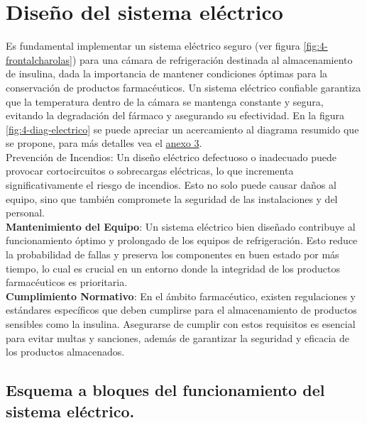  \section{Diseño del sistema eléctrico}
 Es fundamental implementar un sistema eléctrico seguro (ver figura \ref{fig:4-frontalcharolas}) para una cámara de refrigeración destinada al almacenamiento de insulina, dada la importancia de mantener condiciones óptimas para la conservación de productos farmacéuticos. Un sistema eléctrico confiable garantiza que la temperatura dentro de la cámara se mantenga constante y segura, evitando la degradación del fármaco y asegurando su efectividad. En la figura \ref{fig:4-diag-electrico} se puede apreciar un acercamiento al diagrama resumido que se propone, para más detalles vea el \hyperref[axo:diag-electrico]{anexo 3}. \\
 Prevención de Incendios: Un diseño eléctrico defectuoso o inadecuado puede provocar cortocircuitos o sobrecargas eléctricas, lo que incrementa significativamente el riesgo de incendios. Esto no solo puede causar daños al equipo, sino que también compromete la seguridad de las instalaciones y del personal.\\
  \textbf{Mantenimiento del Equipo}: Un sistema eléctrico bien diseñado contribuye al funcionamiento óptimo y prolongado de los equipos de refrigeración. Esto reduce la probabilidad de fallas y preserva los componentes en buen estado por más tiempo, lo cual es crucial en un entorno donde la integridad de los productos farmacéuticos es prioritaria.\\
\textbf{Cumplimiento Normativo}: En el ámbito farmacéutico, existen regulaciones y estándares específicos que deben cumplirse para el almacenamiento de productos sensibles como la insulina. Asegurarse de cumplir con estos requisitos es esencial para evitar multas y sanciones, además de garantizar la seguridad y eficacia de los productos almacenados.


\subsection{Esquema a bloques del funcionamiento del sistema eléctrico.}

